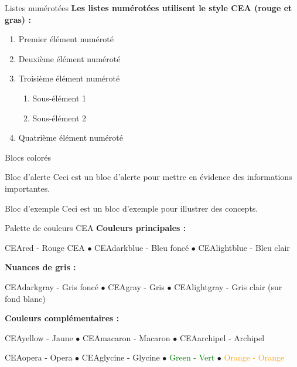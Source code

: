 \documentclass[10pt,aspectratio=169]{beamer}
\begin{document}
\begin{frame}{Listes numérotées}
\textbf{Les listes numérotées utilisent le style CEA (rouge et gras) :}
\begin{enumerate}
    \item Premier élément numéroté
    \item Deuxième élément numéroté
    \item Troisième élément numéroté
        \begin{enumerate}
            \item Sous-élément 1
            \item Sous-élément 2
        \end{enumerate}
    \item Quatrième élément numéroté
\end{enumerate}
\end{frame}

\begin{frame}{Blocs colorés}

\vspace{0.5em}

\begin{alertblock}{Bloc d'alerte}
Ceci est un bloc d'alerte pour mettre en évidence des informations importantes.
\end{alertblock}

\vspace{0.5em}

\begin{exampleblock}{Bloc d'exemple}
Ceci est un bloc d'exemple pour illustrer des concepts.
\end{exampleblock}
\end{frame}

\begin{frame}{Palette de couleurs CEA}
\textbf{Couleurs principales :}

\textcolor{CEAred}{CEAred - Rouge CEA} $\bullet$
\textcolor{CEAdarkblue}{CEAdarkblue - Bleu foncé} $\bullet$
\textcolor{CEAlightblue}{CEAlightblue - Bleu clair}

\vspace{0.5em}
\textbf{Nuances de gris :}

\textcolor{CEAdarkgray}{CEAdarkgray - Gris foncé} $\bullet$
\textcolor{CEAgray}{CEAgray - Gris} $\bullet$
\textcolor{CEAlightgray}{CEAlightgray - Gris clair (sur fond blanc)}

\vspace{0.5em}
\textbf{Couleurs complémentaires :}

\textcolor{CEAyellow}{CEAyellow - Jaune} $\bullet$
\textcolor{CEAmacaron}{CEAmacaron - Macaron} $\bullet$
\textcolor{CEAarchipel}{CEAarchipel - Archipel}

\textcolor{CEAopera}{CEAopera - Opera} $\bullet$
\textcolor{CEAglycine}{CEAglycine - Glycine} $\bullet$
\textcolor{Green}{Green - Vert} $\bullet$
\textcolor{Orange}{Orange - Orange}
\end{frame}
\end{document}
